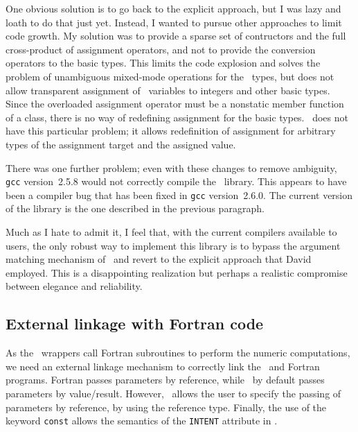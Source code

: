 One obvious solution is to go back to the explicit approach,
but I was lazy and loath to do that just yet.
Instead,
I wanted to pursue other approaches to limit code growth.
My solution was to provide a sparse set of contructors and the full
cross-product of assignment operators,
and not to provide the conversion operators to the basic types.
This limits the code explosion and solves the problem of unambiguous
mixed-mode operations for the \mp\ types,
but does not allow transparent assignment of \mp\ variables to
integers and other basic types.
Since the overloaded assignment operator must be a nonstatic member
function of a class,
there is no way of redefining assignment for the basic types.
\Fninety\ does not have this particular problem;
it allows redefinition of assignment for arbitrary types of the
assignment target and the assigned value.

There was one further problem;
even with these changes to remove ambiguity,
\verb|gcc| version~2.5.8 would not correctly compile the \mp\ library.
This appears to have been a compiler bug that has been fixed in
\verb|gcc| version~2.6.0.
The current version of the library is the one described in the
previous paragraph.

Much as I hate to admit it,
I feel that,
with the current compilers available to users,
the only robust way to implement this library is to bypass the
argument matching mechanism of \CC\ and revert to the explicit
approach that David employed.
This is a disappointing realization but perhaps a realistic compromise
between elegance and reliability.

\subsection{External linkage with Fortran code}

As the \CC\ wrappers call Fortran subroutines to perform the numeric
computations,
we need an external linkage mechanism to correctly link the \CC\ and
Fortran programs.
Fortran passes parameters by reference,
while \CC\ by default passes parameters by value/result.
However,
\CC\ allows the user to specify the passing of parameters by
reference,
by using the reference type.
Finally,
the use of the keyword \verb|const| allows the semantics of the
\verb|INTENT| attribute in \Fninety.

